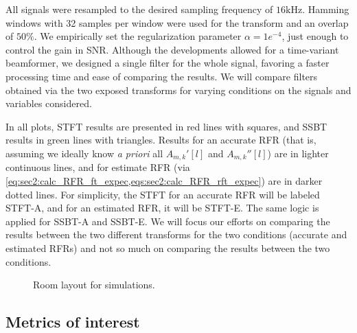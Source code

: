 All signals were resampled to the desired sampling frequency of $16\si{\kilo\hertz}$. Hamming windows with 32 samples per window were used for the transform and an overlap of $50\%$. We empirically set the regularization parameter $\alpha = 1e^{-4}$, just enough to control the gain in SNR. Although the developments allowed for a time-variant beamformer, we designed a single filter for the whole signal, favoring a faster processing time and ease of comparing the results. We will compare filters obtained via the two exposed transforms for varying conditions on the signals and variables considered.

In all plots, STFT results are presented in red lines with squares, and SSBT results in green lines with triangles. Results for an accurate RFR (that is, assuming we ideally know \textit{a priori} all $A_{m,k}'[l]$ and $A_{m,k}''[l]$) are in lighter continuous lines, and for estimate RFR (via \cref{eq:sec2:calc_RFR_ft_expec,eqs:sec2:calc_RFR_rft_expec}) are in darker dotted lines. For simplicity, the STFT for an accurate RFR will be labeled STFT-A, and for an estimated RFR, it will be STFT-E. The same logic is applied for SSBT-A and SSBT-E. We will focus our efforts on comparing the results between the two different transforms for the two conditions (accurate and estimated RFRs) and not so much on comparing the results between the two conditions.

\begin{figure}[!t]
	\centering
	
	\caption{Room layout for simulations.}
	\label{fig:room_layout}
\end{figure}
%

\subsection{Metrics of interest}

